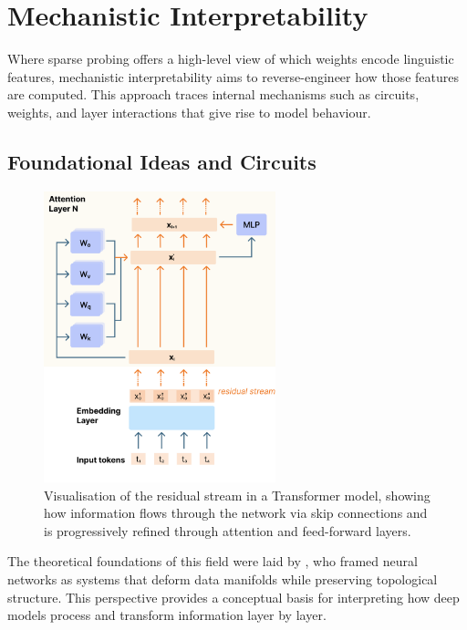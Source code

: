 \section{Mechanistic Interpretability}

Where sparse probing offers a high-level view of which weights encode linguistic features, mechanistic interpretability aims to reverse-engineer how those features are computed. This approach traces internal mechanisms such as circuits, weights, and layer interactions that give rise to model behaviour. 

\subsection{Foundational Ideas and Circuits}

\begin{figure}[ht!]
    \centering
    \includegraphics[width=0.6\textwidth]{chapters/analysis_background/figures/residual_stream_visualization.pdf}
    \caption{Visualisation of the residual stream in a Transformer model, showing how information flows through the network via skip connections and is progressively refined through attention and feed-forward layers.}
    \label{fig:residual-stream}
\end{figure}


The theoretical foundations of this field were laid by \citet{olah2014manifolds}, who framed neural networks as systems that deform data manifolds while preserving topological structure. This perspective provides a conceptual basis for interpreting how deep models process and transform information layer by layer.

